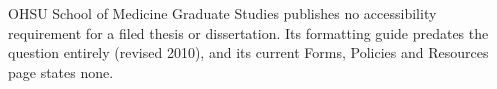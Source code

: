 
%



%
	{OHSU School of Medicine Graduate Studies publishes no accessibility
	 requirement for a filed thesis or dissertation. Its formatting guide
	 predates the question entirely (revised 2010), and its current Forms,
	 Policies and Resources page states none.}

